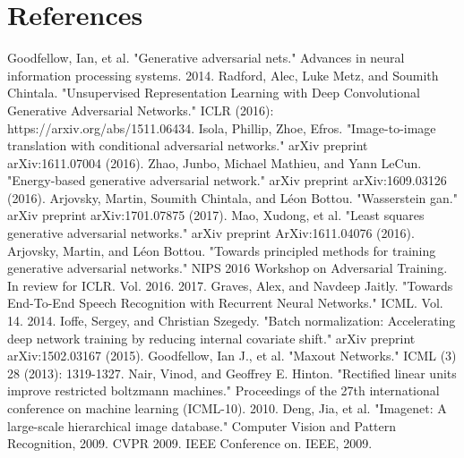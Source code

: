 \documentclass[9pt]{article}
\begin{document}
\pagebreak

\section{References}

\noindent [1] Goodfellow, Ian, et al. "Generative adversarial nets." Advances in neural information processing systems. 2014. \newline
\noindent [2] Radford, Alec, Luke Metz, and Soumith Chintala. "Unsupervised Representation Learning with Deep Convolutional Generative Adversarial Networks." ICLR (2016): https://arxiv.org/abs/1511.06434. \newline
\noindent [3] Isola, Phillip, Zhoe, Efros. "Image-to-image translation with conditional adversarial networks." arXiv preprint arXiv:1611.07004 (2016). \newline
\noindent [4] Zhao, Junbo, Michael Mathieu, and Yann LeCun. "Energy-based generative adversarial network." arXiv preprint arXiv:1609.03126 (2016). \newline
\noindent [5] Arjovsky, Martin, Soumith Chintala, and Léon Bottou. "Wasserstein gan." arXiv preprint arXiv:1701.07875 (2017). \newline
\noindent [6] Mao, Xudong, et al. "Least squares generative adversarial networks." arXiv preprint ArXiv:1611.04076 (2016). \newline
\noindent [7] Arjovsky, Martin, and Léon Bottou. "Towards principled methods for training generative adversarial networks." NIPS 2016 Workshop on Adversarial Training. In review for ICLR. Vol. 2016. 2017. \newline
\noindent [8] Graves, Alex, and Navdeep Jaitly. "Towards End-To-End Speech Recognition with Recurrent Neural Networks." ICML. Vol. 14. 2014. \newline
\noindent [9] Ioffe, Sergey, and Christian Szegedy. "Batch normalization: Accelerating deep network training by reducing internal covariate shift." arXiv preprint arXiv:1502.03167 (2015). \newline
\noindent [10] Goodfellow, Ian J., et al. "Maxout Networks." ICML (3) 28 (2013): 1319-1327. \newline
\noindent [11] Nair, Vinod, and Geoffrey E. Hinton. "Rectified linear units improve restricted boltzmann machines." Proceedings of the 27th international conference on machine learning (ICML-10). 2010. \newline
\noindent [12] Deng, Jia, et al. "Imagenet: A large-scale hierarchical image database." Computer Vision and Pattern Recognition, 2009. CVPR 2009. IEEE Conference on. IEEE, 2009. \newline
\end{document}

